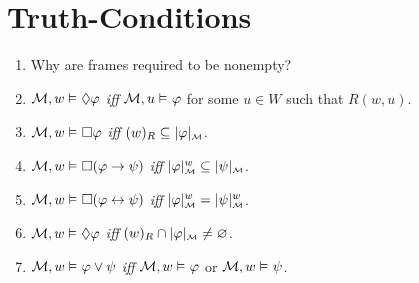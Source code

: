 \documentclass[a4paper, 11pt]{article}                  %
\begin{document}

\section{Truth-Conditions}

\begin{enumerate}

	\item Why are frames required to be nonempty?

	\item $\M, w \MLmodels[] \Diamond\metaA$ \textit{iff} $\M, u \MLmodels \metaA$ for some $u \in W$ such that $R(w, u)$.

	\item $\M, w \MLmodels[] \Box\metaA$ \textit{iff} $(w)_R \subseteq \interpret{\M}{\metaA}$.

	\item $\M, w \MLmodels[] \Box(\metaA \rightarrow \metaB)$ \textit{iff} $\interpret{\M}{\metaA}^w \subseteq \interpret{\M}{\metaB}$.

	\item $\M, w \MLmodels[] \Box(\metaA \leftrightarrow \metaB)$ \textit{iff} $\interpret{\M}{\metaA}^w = \interpret{\M}{\metaB}^w$.

	\item $\M, w \MLmodels[] \Diamond\metaA$ \textit{iff} $(w)_R \cap \interpret{\M}{\metaA} \neq \varnothing$.

	\item $\M, w \MLmodels[] \metaA \vee \metaB$ \textit{iff} $\M, w \MLmodels \metaA$ or $\M, w \MLmodels \metaB$.

\end{enumerate}
\end{document}
